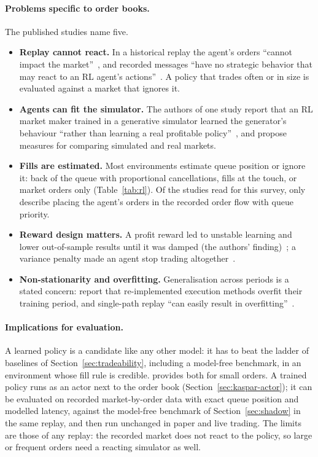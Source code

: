 \paragraph{Problems specific to order books.} The published studies name five.
\begin{itemize}[leftmargin=1.5em,itemsep=1pt]
\item \textbf{Replay cannot react.} In a historical replay the agent's orders ``cannot impact the
  market''~\citep{spooner2018}, and recorded messages ``have no strategic behavior that may react to an RL agent's
  actions''~\citep{frey2023}. A policy that trades often or in size is evaluated against a market that ignores it.
\item \textbf{Agents can fit the simulator.} The authors of one study report that an RL market maker trained in a
  generative simulator learned the generator's behaviour ``rather than learning a real profitable
  policy''~\citep{coletta2023cgan}, and \citet{vyetrenko2020getreal} propose measures for comparing
  simulated and real markets.
\item \textbf{Fills are estimated.} Most environments estimate queue position or ignore it: back of the queue with
  proportional cancellations, fills at the touch, or market orders only (Table~\ref{tab:rl}). Of the studies read for
  this survey, only \citet{nevmyvaka2006} describe placing the agent's orders in the recorded order flow with queue
  priority.
\item \textbf{Reward design matters.} A profit reward led to unstable learning and lower out-of-sample results until
  it was damped (the authors' finding)~\citep{spooner2018}; a variance penalty made an agent stop trading altogether~\citep{ganesh2019dealer}.
\item \textbf{Non-stationarity and overfitting.} Generalisation across periods is a stated concern: \citet{zhang2023generalizable} report
  that re-implemented execution methods overfit their training period, and single-path replay ``can easily result in
  overfitting''~\citep{gasperov2021survey}.
\end{itemize}

\paragraph{Implications for evaluation.} A learned policy is a candidate like any other model: it has to beat the
ladder of baselines of Section~\ref{sec:tradeability}, including a model-free benchmark, in an environment whose fill
rule is credible. \kasparhft{} provides both for small orders. A trained policy runs as an actor next to the order book
(Section~\ref{sec:kaspar-actor}); it can be evaluated on recorded market-by-order data with exact queue position and
modelled latency, against the model-free benchmark of Section~\ref{sec:shadow} in the same replay, and then run
unchanged in paper and live trading. The limits are those of any replay: the recorded market does not react to the
policy, so large or frequent orders need a reacting simulator as well.


